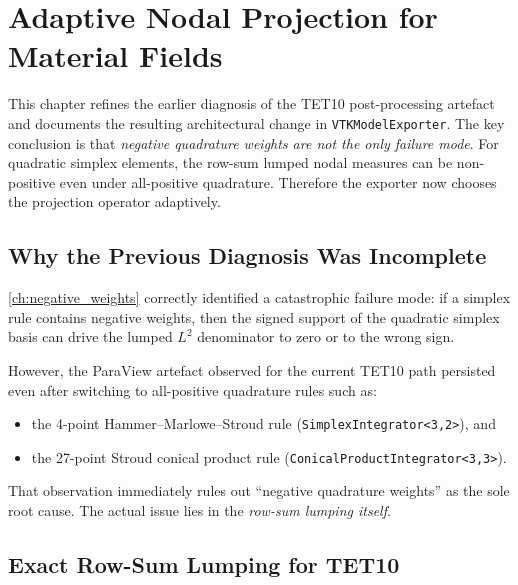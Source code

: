 
\chapter{Adaptive Nodal Projection for Material Fields}
\label{ch:adaptive_projection}

This chapter refines the earlier diagnosis of the TET10 post-processing
artefact and documents the resulting architectural change in
\texttt{VTKModelExporter}.  The key conclusion is that \emph{negative
quadrature weights are not the only failure mode}.  For quadratic simplex
elements, the row-sum lumped nodal measures can be non-positive even under
all-positive quadrature.  Therefore the exporter now chooses the projection
operator adaptively.


\section{Why the Previous Diagnosis Was Incomplete}
\label{sec:adaptive_prev_diag}

\cref{ch:negative_weights} correctly identified a catastrophic failure mode:
if a simplex rule contains negative weights, then the signed support of the
quadratic simplex basis can drive the lumped $L^2$ denominator to zero or to
the wrong sign.

However, the ParaView artefact observed for the current TET10 path persisted
even after switching to all-positive quadrature rules such as:
\begin{itemize}[nosep]
  \item the 4-point Hammer--Marlowe--Stroud rule
        (\texttt{SimplexIntegrator<3,2>}), and
  \item the 27-point Stroud conical product rule
        (\texttt{ConicalProductIntegrator<3,3>}).
\end{itemize}

That observation immediately rules out ``negative quadrature weights'' as the
sole root cause.  The actual issue lies in the \emph{row-sum lumping itself}.


\section{Exact Row-Sum Lumping for TET10}
\label{sec:adaptive_tet10_exact}

